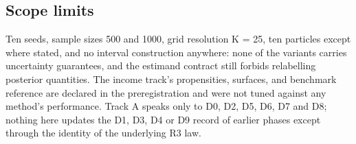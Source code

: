 \subsection{Scope limits}

Ten seeds, sample sizes 500 and 1000, grid resolution K = 25, ten particles
except where stated, and no interval construction anywhere: none of the
variants carries uncertainty guarantees, and the estimand contract still
forbids relabelling posterior quantities. The income track's propensities,
surfaces, and benchmark reference are declared in the preregistration and were
not tuned against any method's performance. Track A speaks only to D0, D2, D5,
D6, D7 and D8; nothing here updates the D1, D3, D4 or D9 record of earlier
phases except through the identity of the underlying R3 law.


